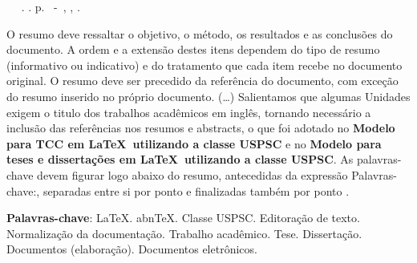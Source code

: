 \setlength{\absparsep}{18pt} %
\begin{resumo}
	\begin{flushleft} 
			\setlength{\absparsep}{0pt} %
			\SingleSpacing 
			\imprimirautorabr~ ~\textbf{\imprimirtitulo}.	\imprimirdata. \pageref{LastPage}p. 
			\imprimirtipotrabalho~-~\imprimirinstituicao, \imprimirlocal, \imprimirdata. 
 	\end{flushleft}
\OnehalfSpacing 			
 O resumo deve ressaltar o  objetivo, o método, os resultados e as conclusões do documento. A ordem e a extensão  destes itens dependem do tipo de resumo (informativo ou indicativo) e do  tratamento que cada item recebe no documento original. O resumo deve ser
 precedido da referência do documento, com exceção do resumo inserido no
 próprio documento. (\ldots)  Salientamos que algumas Unidades exigem o titulo dos trabalhos acadêmicos em inglês, tornando necessário a inclusão das referências nos resumos e abstracts, o que foi adotado no \textbf{Modelo para TCC em \LaTeX\ utilizando a classe USPSC} e no \textbf{Modelo para teses e dissertações em \LaTeX\ utilizando a classe USPSC}. As palavras-chave devem figurar logo abaixo do  resumo, antecedidas da expressão Palavras-chave:, separadas entre si por  ponto e finalizadas também por ponto \cite{nbr6028}.
 

 \textbf{Palavras-chave}: LaTeX. abnTeX. Classe USPSC. Editoração de texto. Normalização da documentação. Trabalho acadêmico. Tese. Dissertação. Documentos (elaboração). Documentos eletrônicos. 
\end{resumo}